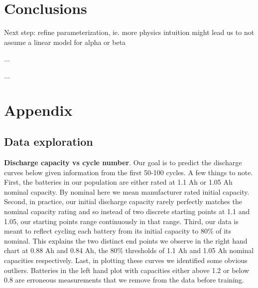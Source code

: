 \documentclass{article}
\begin{document}
\section{Conclusions}
Next step: refine parameterization, ie. more physics intuition might lead us to not assume a linear model for alpha or beta

...

...




\section{Appendix}
\subsection{Data exploration}

\textbf{Discharge capacity vs cycle number}. Our goal is to predict the discharge curves below given information from the first 50-100 cycles. A few things to note. First, the batteries in our population are either rated at 1.1 Ah or 1.05 Ah nominal capacity. By nominal here we mean manufacturer rated initial capacity. Second, in practice, our initial discharge capacity rarely perfectly matches the nominal capacity rating and so instead of two discrete starting points at 1.1 and 1.05, our starting points range continuously in that range. Third, our data is meant to reflect cycling each battery from its initial capacity to 80\% of its nominal. This explains the two distinct end points we observe in the right hand chart at 0.88 Ah and 0.84 Ah, the 80\% thresholds of 1.1 Ah and 1.05 Ah nominal capacities respectively. Last, in plotting these curves we identified some obvious outliers. Batteries in the left hand plot with capacities either above 1.2 or below 0.8 are erroneous measurements that we remove from the data before training.  
\end{document}
